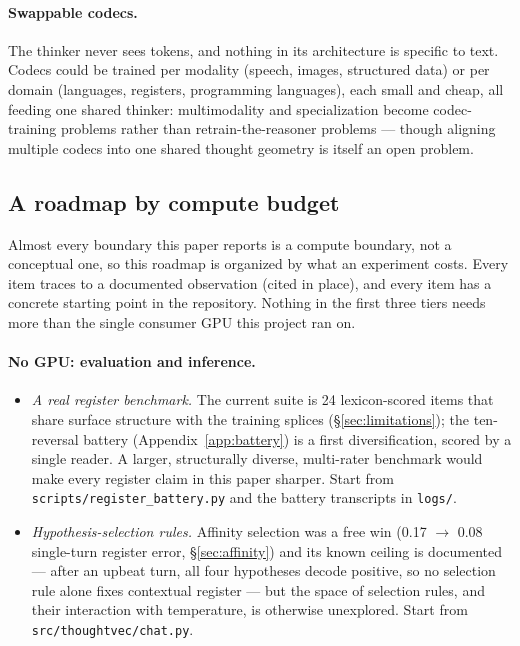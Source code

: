 \documentclass[11pt]{article}
\begin{document}
\paragraph{Swappable codecs.} The thinker never sees tokens, and nothing in
its architecture is specific to text. Codecs could be trained per modality
(speech, images, structured data) or per domain (languages, registers,
programming languages), each small and cheap, all feeding one shared
thinker: multimodality and specialization become codec-training problems
rather than retrain-the-reasoner problems --- though aligning multiple
codecs into one shared thought geometry is itself an open problem.

\subsection{A roadmap by compute budget}
\label{sec:further}

Almost every boundary this paper reports is a compute boundary, not a
conceptual one, so this roadmap is organized by what an experiment costs.
Every item traces to a documented observation (cited in place), and every
item has a concrete starting point in the repository. Nothing in the first
three tiers needs more than the single consumer GPU this project ran on.

\paragraph{No GPU: evaluation and inference.}
\begin{itemize}
  \item \emph{A real register benchmark.} The current suite is 24
    lexicon-scored items that share surface structure with the training
    splices (\S\ref{sec:limitations}); the ten-reversal battery
    (Appendix~\ref{app:battery}) is a first diversification, scored by a
    single reader. A larger, structurally diverse, multi-rater benchmark
    would make every register claim in this paper sharper. Start from
    \nolinkurl{scripts/register_battery.py} and the battery transcripts in
    \texttt{logs/}.
  \item \emph{Hypothesis-selection rules.} Affinity selection was a free
    win (0.17 $\to$ 0.08 single-turn register error, \S\ref{sec:affinity})
    and its known ceiling is documented --- after an upbeat turn, all four
    hypotheses decode positive, so no selection rule alone fixes contextual
    register --- but the space of selection rules, and their interaction
    with temperature, is otherwise unexplored. Start from
    \nolinkurl{src/thoughtvec/chat.py}.
\end{itemize}
\end{document}
